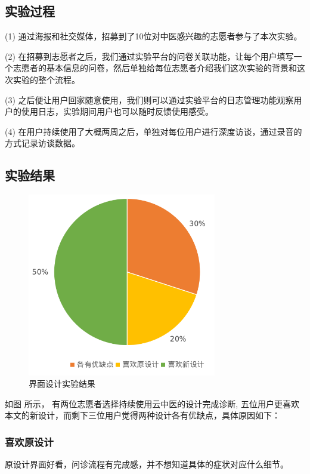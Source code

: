 \subsection{实验过程}

(1) 通过海报和社交媒体，招募到了10位对中医感兴趣的志愿者参与了本次实验。

(2) 在招募到志愿者之后，我们通过实验平台的问卷关联功能，让每个用户填写一个志愿者的基本信息的问卷，然后单独给每位志愿者介绍我们这次实验的背景和这次实验的整个流程。

(3) 之后便让用户回家随意使用，我们则可以通过实验平台的日志管理功能观察用户的使用日志，实验期间用户也可以随时反馈使用感受。

(4)  在用户持续使用了大概两周之后，单独对每位用户进行深度访谈，通过录音的方式记录访谈数据。



\subsection{实验结果}


\begin{figure}[ht]
    \centering
    \includegraphics[height=8cm]{images/ui-exp.png}
    \caption{界面设计实验结果}
    \label{fig:ui-exp}
\end{figure}

如图 \cite{fig:ui-exp}所示， 有两位志愿者选择持续使用云中医的设计完成诊断, 五位用户更喜欢本文的新设计，而剩下三位用户觉得两种设计各有优缺点，具体原因如下：

\subsubsection{喜欢原设计}

原设计界面好看，问诊流程有完成感，并不想知道具体的症状对应什么细节。

